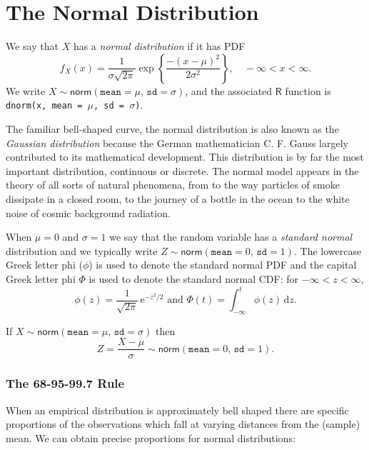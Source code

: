 \section{The Normal Distribution}
\label{sec-6-3}

We say that \(X\) has a \emph{normal distribution} if it has PDF
\begin{equation}
f_{X}(x)=\frac{1}{\sigma\sqrt{2\pi}}\exp \left\{ \frac{-(x-\mu)^{2}}{2\sigma^{2}} \right\},\quad -\infty < x < \infty.
\end{equation}
We write
\(X\sim\mathsf{norm}(\mathtt{mean}=\mu,\,\mathtt{sd}=\sigma)\), and
the associated \(\mathsf{R}\) function is \texttt{dnorm(x, mean = $\mu$, sd = $\sigma$)}.

The familiar bell-shaped curve, the normal distribution is also known
as the \emph{Gaussian distribution} because the German mathematician
C. F. Gauss largely contributed to its mathematical development. This
distribution is by far the most important distribution, continuous or
discrete. The normal model appears in the theory of all sorts of
natural phenomena, from to the way particles of smoke dissipate in a
closed room, to the journey of a bottle in the ocean to the white
noise of cosmic background radiation.

When \(\mu=0\) and \(\sigma=1\) we say that the random variable has a
\emph{standard normal} distribution and we typically write
\(Z\sim\mathsf{norm}(\mathtt{mean}=0,\,\mathtt{sd}=1)\). The lowercase
Greek letter phi (\(\phi\)) is used to denote the standard normal PDF
and the capital Greek letter phi \(\Phi\) is used to denote the
standard normal CDF: for \(-\infty<z<\infty\),
\begin{equation}
\phi(z)=\frac{1}{\sqrt{2\pi}}\,\mathrm{e}^{-z^{2}/2}\mbox{ and }\Phi(t)=\int_{-\infty}^{t}\phi(z)\,\mathrm{d} z.
\end{equation}

\begin{prop}
If \(X\sim\mathsf{norm}(\mathtt{mean}=\mu,\,\mathtt{sd}=\sigma)\) then
\begin{equation}
Z=\frac{X-\mu}{\sigma}\sim\mathsf{norm}(\mathtt{mean}=0,\,\mathtt{sd}=1).
\end{equation}
\end{prop}

\subsubsection{The 68-95-99.7 Rule} 
When an
empirical distribution is approximately bell shaped there are specific
proportions of the observations which fall at varying distances from
the (sample) mean.
We can obtain precise proportions for normal distributions:


